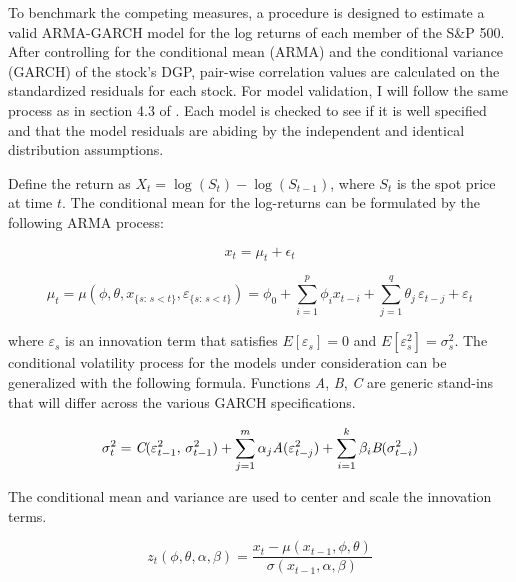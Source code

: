 \documentclass[12pt]{article}
\begin{document}
To benchmark the competing measures, a procedure is designed to estimate a valid ARMA-GARCH model for the log returns of each member of the S\&P 500. After controlling for the conditional mean (ARMA) and the conditional variance (GARCH) of the stock's DGP, pair-wise correlation values are calculated on the standardized residuals for each stock. For model validation, I will follow the same process as in section 4.3 of \cite{DowiakTV-COP}. Each model is checked to see if it is well specified and that the model residuals are abiding by the independent and identical distribution assumptions.

Define the return as $X_{t} = \log \left(S_{t}\right) - \log\left(S_{t-1}\right)$, where $S_{t}$ is the spot price at time $t$. The conditional mean for the log-returns can be formulated by the following ARMA process:

\begin{equation} \label{eqn:marginalModel}
    x_{t} = \mu_{t} + \epsilon_{t}
\end{equation}

\begin{equation} \label{eq:conditional_mean}
    \mu_{t} = \mu(\phi, \theta, x_{\{s:\, s < t\}}, \varepsilon_{\{s:\, s < t\}}) = \phi_{0} + \sum_{i=1}^{p} \phi_{i} x_{t-i} + \sum_{j=1}^{q} \theta_{j} \, \varepsilon_{t - j} + \varepsilon_{t}
\end{equation}

where $\varepsilon_{s}$ is an innovation term that satisfies $E[\varepsilon_{s}] = 0$ and $E[\varepsilon^{2}_{s}] = \sigma^{2}_{s}$. The conditional volatility process for the models under consideration can be generalized with the following formula. Functions \emph{A}, \emph{B}, \emph{C} are generic stand-ins that will differ across the various GARCH specifications.

\begin{equation} \label{eq:conditional_var}
    \sigma^{2}_{t} = \emph{C}(\varepsilon^{2}_{t-1}, \, \sigma^{2}_{t-1}) + \sum_{j=1}^{m} \alpha_{j} \emph{A}(\varepsilon^{2}_{t - j}) + \sum_{i=1}^{k} \beta_{i} \emph{B}(\sigma^{2}_{t - i})
\end{equation}

The conditional mean and variance are used to center and scale the innovation terms.

\begin{equation}
    z_{t}(\phi, \theta, \alpha, \beta) = \frac{x_{t} - \mu(x_{t-1}, \phi, \theta)}{\sigma(x_{t-1}, \alpha, \beta)}
\end{equation}
\end{document}
